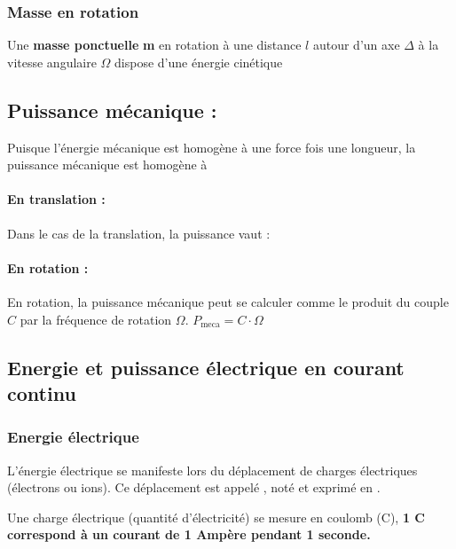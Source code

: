 \documentclass[10pt,fleqn]{article} %
\begin{document}
\subsubsection{Masse en rotation}
\begin{defi}
  Une \textbf{masse ponctuelle} \textbf{m} en rotation à une distance $l$ autour d'un axe $\Delta$ à la vitesse angulaire $\Omega$ dispose d'une énergie cinétique 
\end{defi}


\subsection{Puissance mécanique : }
Puisque l'énergie mécanique est homogène à une force fois une longueur, la puissance mécanique est homogène à 

\begin{defi}
  \paragraph{En translation : } Dans le cas de la translation, la puissance vaut : 
\paragraph{En rotation : }En rotation, la puissance mécanique peut se calculer comme le produit du couple $C$ par la fréquence de rotation $\Omega$. 
$P_{\text{meca}} = C \cdot \Omega$
\end{defi}


\subsection{Energie et puissance électrique en courant continu}
\subsubsection{Energie électrique}
\begin{defi}
  L'énergie électrique se manifeste lors du déplacement de charges électriques (électrons ou ions). Ce déplacement est appelé , noté  et exprimé en .

Une charge électrique (quantité d'électricité) se mesure en coulomb (C), \textbf{1 C correspond à un courant de 1 Ampère pendant 1 seconde.}
\end{defi}
\end{document}
